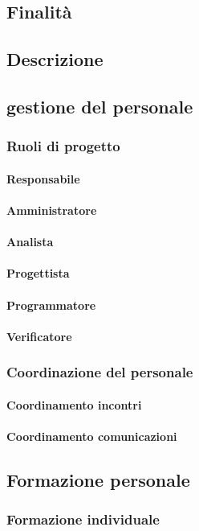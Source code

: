 \documentclass[../norme-di-progetto.tex]{subfiles}
\begin{document}
\subsection{Finalità}
\subsection{Descrizione}
\subsection{gestione del personale}
\subsubsection{Ruoli di progetto}
\paragraph{Responsabile}
\paragraph{Amministratore}
\paragraph{Analista}
\paragraph{Progettista}
\paragraph{Programmatore}
\paragraph{Verificatore}
\subsubsection{Coordinazione del personale}
\paragraph{Coordinamento incontri}
\paragraph{Coordinamento comunicazioni}
\subsection{Formazione personale}
\subsubsection{Formazione individuale}
\end{document}
